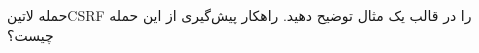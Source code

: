 \documentclass[../main.tex]{subfiles}
\begin{document}

حمله ‌لاتین{CSRF} را در قالب یک مثال توضیح دهید. راهکار پیش‌گیری از این حمله چیست؟
\end{document}

